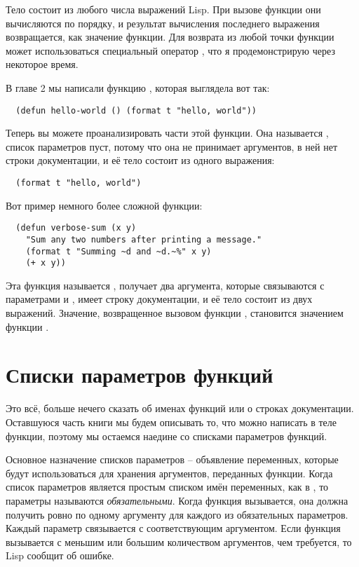 Тело  состоит из любого числа выражений Lisp.  При вызове функции они
вычисляются по порядку, и результат вычисления последнего выражения возвращается, как
значение функции.  Для возврата из любой точки функции может использоваться специальный
оператор , что я продемонстрирую через некоторое время.

В главе 2 мы написали функцию , которая выглядела вот так:

\begin{lstlisting}
  (defun hello-world () (format t "hello, world"))
\end{lstlisting}

Теперь вы можете проанализировать части этой функции.  Она называется ,
список параметров пуст, потому что она не принимает аргументов, в ней нет строки
документации, и её тело состоит из одного выражения:

\begin{lstlisting}
  (format t "hello, world")
\end{lstlisting}

Вот пример немного более сложной функции:

\begin{lstlisting}
  (defun verbose-sum (x y)
    "Sum any two numbers after printing a message."
    (format t "Summing ~d and ~d.~%" x y)
    (+ x y))
\end{lstlisting}

Эта функция называется , получает два аргумента, которые связываются с
параметрами  и , имеет строку документации, и её тело состоит из двух
выражений.  Значение, возвращенное вызовом функции \code{+}, становится значением функции
.

\section{Списки параметров функций}

Это всё, больше нечего сказать об именах функций или о строках документации. Оставшуюся
часть книги мы будем описывать то, что можно написать в теле функции, поэтому мы остаемся
наедине со списками параметров функций.

Основное назначение списков параметров -- объявление переменных, которые будут
использоваться для хранения аргументов, переданных функции.  Когда список параметров
является простым списком имён переменных, как в , то параметры
называются \textit{обязательными}.  Когда функция вызывается, она должна получить ровно по
одному аргументу для каждого из обязательных параметров.  Каждый параметр связывается с
соответствующим аргументом.  Если функция вызывается с меньшим или большим количеством
аргументов, чем требуется, то Lisp сообщит об ошибке.

